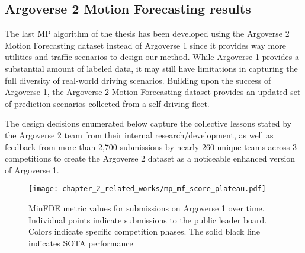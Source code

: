 \subsection{Argoverse 2 Motion Forecasting results}
\label{subsec:2_argoverse_2}

The last \ac{MP} algorithm of the thesis has been developed using the Argoverse 2 Motion Forecasting dataset instead of Argoverse 1 since it provides way more utilities and traffic scenarios to design our method. While Argoverse 1 provides a substantial amount of labeled data, it may still have limitations in capturing the full diversity of real-world driving scenarios. Building upon the success of Argoverse 1, the Argoverse 2 Motion Forecasting dataset provides an updated set of prediction scenarios collected from a self-driving fleet. 

The design decisions enumerated below capture the collective lessons stated by the Argoverse 2 team from their internal research/development, as well as feedback from more than 2,700 submissions by nearly 260 unique teams across 3 competitions \cite{argoverse_forecasting_challenge} to create the Argoverse 2 dataset as a noticeable enhanced version of Argoverse 1.

\begin{figure}[h]
	\centering
	\texttt{[image: chapter\_2\_related\_works/mp\_mf\_score\_plateau.pdf]}
	\caption[MinFDE metric values for submissions on Argoverse 1 over time]{MinFDE metric values for submissions on Argoverse 1 over time. Individual points indicate submissions to the public leader board. Colors indicate specific competition phases. The solid black line indicates SOTA performance}
	\label{fig:chapter_2_related_works/mp_mf_score_plateau}
\end{figure}

